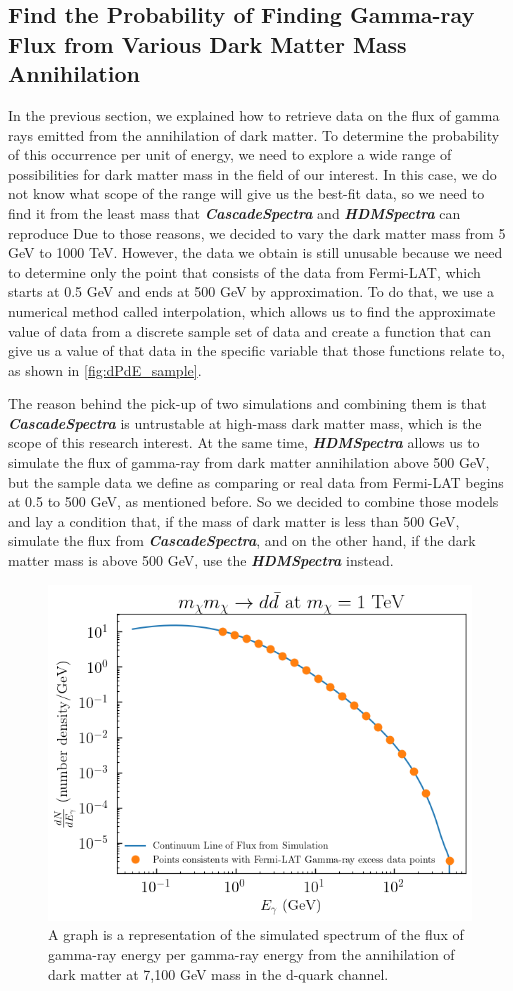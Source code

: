 \documentclass[10pt, oneside]{book}
\numberwithin{equation}{chapter}
\begin{document}
\subsection{Find the Probability of Finding Gamma-ray Flux from Various Dark Matter Mass Annihilation}
In the previous section, we explained how to retrieve data on the flux of gamma rays emitted from the annihilation of dark matter. To determine the probability of this occurrence per unit of energy, we need to explore a wide range of possibilities for dark matter mass in the field of our interest. In this case, we do not know what scope of the range will give us the best-fit data, so we need to find it from the least mass that \textbf{\textit{CascadeSpectra}} and \textbf{\textit{HDMSpectra}} can reproduce Due to those reasons, we decided to vary the dark matter mass from 5 GeV to 1000 TeV. However, the data we obtain is still unusable because we need to determine only the point that consists of the data from Fermi-LAT, which starts at 0.5 GeV and ends at 500 GeV by approximation. To do that, we use a numerical method called interpolation, which allows us to find the approximate value of data from a discrete sample set of data and create a function that can give us a value of that data in the specific variable that those functions relate to, as shown in \autoref{fig:dPdE_sample}.

The reason behind the pick-up of two simulations and combining them is that \textbf{\textit{CascadeSpectra}} is untrustable at high-mass dark matter mass, which is the scope of this research interest. At the same time, \textbf{\textit{HDMSpectra}} allows us to simulate the flux of gamma-ray from dark matter annihilation above 500 GeV, but the sample data we define as comparing or real data from Fermi-LAT begins at 0.5 to 500 GeV, as mentioned before. So we decided to combine those models and lay a condition that, if the mass of dark matter is less than 500 GeV, simulate the flux from \textbf{\textit{CascadeSpectra}}, and on the other hand, if the dark matter mass is above 500 GeV, use the \textbf{\textit{HDMSpectra}} instead.

\begin{figure}
	\centering
	\includegraphics[width=0.75\linewidth]{images/dPdE_sample_2}
	\caption{A graph is a representation of the simulated spectrum of the flux of gamma-ray energy per gamma-ray energy from the annihilation of dark matter at 7,100 GeV mass in the d-quark channel. }
	\label{fig:dPdE_sample}
\end{figure}
\end{document}
